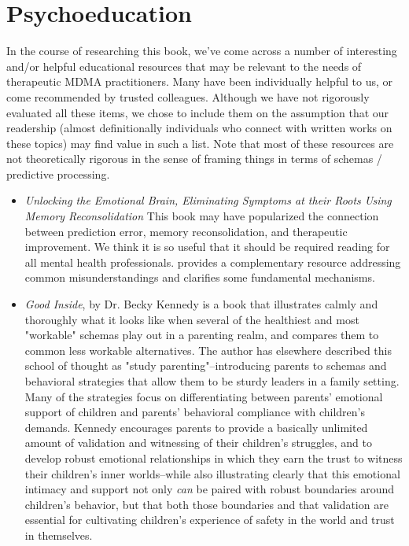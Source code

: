 \documentclass[12pt,letterpaper]{book}
\begin{document}
\section{Psychoeducation}
\label{sec:psychoeducation}
In the course of researching this book, we've come across a number of interesting and/or helpful educational resources that may be relevant to the needs of therapeutic MDMA practitioners. Many have been individually helpful to us, or come recommended by trusted colleagues. Although we have not rigorously evaluated all these items, we chose to include them on the assumption that our readership (almost definitionally individuals who connect with written works on these topics) may find value in such a list. Note that most of these resources are not theoretically rigorous in the sense of framing things in terms of schemas / predictive processing.
\begin{itemize}
    \item \textit{Unlocking the Emotional Brain, Eliminating Symptoms at their Roots Using Memory Reconsolidation} This book may have popularized the connection between prediction error, memory reconsolidation, and therapeutic improvement. We think it is so useful that it should be required reading for all mental health professionals. \textcite{ecker2015misunderstood} provides a complementary resource addressing common misunderstandings and clarifies some fundamental mechanisms.
    \item \textit{Good Inside}, by Dr. Becky Kennedy \cite{kennedy2022good} is a book that illustrates calmly and thoroughly what it looks like when several of the healthiest and most "workable" schemas play out in a parenting realm, and compares them to common less workable alternatives. The author has elsewhere described this school of thought as "study parenting"–introducing parents to schemas and behavioral strategies that allow them to be sturdy leaders in a family setting. Many of the strategies focus on differentiating between parents' emotional support of children and parents' behavioral compliance with children's demands. Kennedy encourages parents to provide a basically unlimited amount of validation and witnessing of their children's struggles, and to develop robust emotional relationships in which they earn the trust to witness their children's inner worlds–while also illustrating clearly that this emotional intimacy and support not only \textit{can} be paired with robust boundaries around children's behavior, but that both those boundaries and that validation are essential for cultivating children's experience of safety in the world and trust in themselves. 


\end{itemize}
\end{document}
